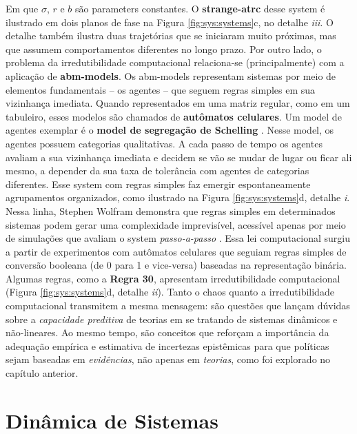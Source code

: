 \documentclass[./main.tex]{subfiles}
\begin{document}
Em que $\sigma$, $r$ e $b$ são \gls{parameters} constantes. O \textbf{\gls{strange-atrc}} desse \gls{system} é ilustrado em dois planos de fase na Figura \ref{fig:sys:systems}c, no detalhe \textrm{\textit{iii}}. O detalhe também ilustra duas trajetórias que se iniciaram muito próximas, mas que assumem comportamentos diferentes no longo prazo. Por outro lado, o problema da irredutibilidade computacional relaciona-se (principalmente) com a aplicação de \textbf{\gls{abm-models}}. Os \gls{abm-models} representam sistemas por meio de elementos fundamentais – os agentes – que seguem regras simples em sua vizinhança imediata. Quando representados em uma matriz regular, como em um tabuleiro, esses modelos são chamados de \textbf{autômatos celulares}. Um \gls{model} de agentes exemplar é o \textbf{\gls{model} de segregação de Schelling} \cite{Schelling1971}. Nesse \gls{model}, os agentes possuem categorias qualitativas. A cada passo de tempo os agentes avaliam a sua vizinhança imediata e decidem se vão se mudar de lugar ou ficar ali mesmo, a depender da sua taxa de tolerância com agentes de categorias diferentes. Esse \gls{system} com regras simples faz emergir espontaneamente agrupamentos organizados, como ilustrado na Figura \ref{fig:sys:systems}d, detalhe \textrm{\textit{i}}. Nessa linha, Stephen Wolfram demonstra que regras simples em determinados sistemas podem gerar uma complexidade imprevisível, acessível apenas por meio de simulações que avaliam o \gls{system} \textit{passo-a-passo} \cite{wolfram1984}. Essa lei computacional surgiu a partir de experimentos com autômatos celulares que seguiam regras simples de conversão booleana (de 0 para 1 e vice-versa) baseadas na representação binária. Algumas regras, como a \textbf{Regra 30}, apresentam irredutibilidade computacional (Figura \ref{fig:sys:systems}d, detalhe \textrm{\textit{ii}}). Tanto o \gls{chaos} quanto a irredutibilidade computacional transmitem a mesma mensagem: são questões que lançam dúvidas sobre a \textit{capacidade preditiva} de teorias em se tratando de sistemas dinâmicos e não-lineares. Ao mesmo tempo, são conceitos que reforçam a importância da adequação empírica e estimativa de incertezas epistêmicas para que políticas sejam baseadas em \textit{evidências}, não apenas em \textit{teorias}, como foi explorado no capítulo anterior.

\section{Dinâmica de Sistemas} \label{sec:sys:dynamics}
\end{document}
